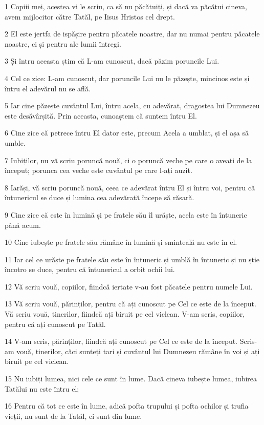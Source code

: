 \par 1 Copiii mei, acestea vi le scriu, ca să nu păcătuiți, și dacă va păcătui cineva, avem mijlocitor către Tatăl, pe Iisus Hristos cel drept.
\par 2 El este jertfa de ispășire pentru păcatele noastre, dar nu numai pentru păcatele noastre, ci și pentru ale lumii întregi.
\par 3 Și întru aceasta știm că L-am cunoscut, dacă păzim poruncile Lui.
\par 4 Cel ce zice: L-am cunoscut, dar poruncile Lui nu le păzește, mincinos este și întru el adevărul nu se află.
\par 5 Iar cine păzește cuvântul Lui, întru acela, cu adevărat, dragostea lui Dumnezeu este desăvârșită. Prin aceasta, cunoaștem că suntem întru El.
\par 6 Cine zice că petrece întru El dator este, precum Acela a umblat, și el așa să umble.
\par 7 Iubiților, nu vă scriu poruncă nouă, ci o poruncă veche pe care o aveați de la început; porunca cea veche este cuvântul pe care l-ați auzit.
\par 8 Iarăși, vă scriu poruncă nouă, ceea ce adevărat întru El și întru voi, pentru că întunericul se duce și lumina cea adevărată începe să răsară.
\par 9 Cine zice că este în lumină și pe fratele său îl urăște, acela este în întuneric până acum.
\par 10 Cine iubește pe fratele său rămâne în lumină și sminteală nu este în el.
\par 11 Iar cel ce urăște pe fratele său este în întuneric și umblă în întuneric și nu știe încotro se duce, pentru că întunericul a orbit ochii lui.
\par 12 Vă scriu vouă, copiilor, fiindcă iertate v-au fost păcatele pentru numele Lui.
\par 13 Vă scriu vouă, părinților, pentru că ați cunoscut pe Cel ce este de la început. Vă scriu vouă, tinerilor, fiindcă ați biruit pe cel viclean. V-am scris, copiilor, pentru că ați cunoscut pe Tatăl.
\par 14 V-am scris, părinților, fiindcă ați cunoscut pe Cel ce este de la început. Scris-am vouă, tinerilor, căci sunteți tari și cuvântul lui Dumnezeu rămâne în voi și ați biruit pe cel viclean.
\par 15 Nu iubiți lumea, nici cele ce sunt în lume. Dacă cineva iubește lumea, iubirea Tatălui nu este întru el;
\par 16 Pentru că tot ce este în lume, adică pofta trupului și pofta ochilor și trufia vieții, nu sunt de la Tatăl, ci sunt din lume.

